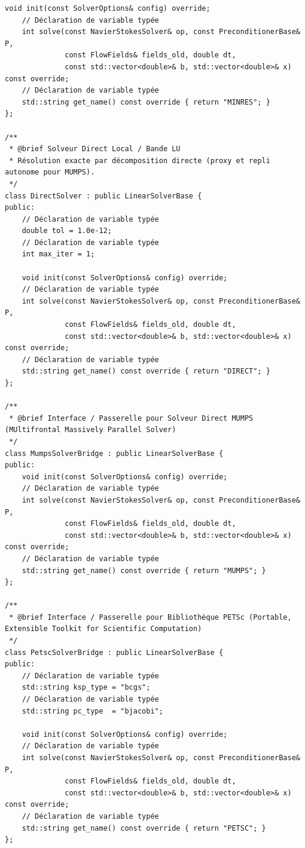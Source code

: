 \documentclass[10pt,a4paper,oneside]{book}
\begin{document}
\begin{lstlisting}[language={[11]C++}]
    void init(const SolverOptions& config) override;
    // Déclaration de variable typée
    int solve(const NavierStokesSolver& op, const PreconditionerBase& P,
              const FlowFields& fields_old, double dt,
              const std::vector<double>& b, std::vector<double>& x) const override;
    // Déclaration de variable typée
    std::string get_name() const override { return "MINRES"; }
};

/**
 * @brief Solveur Direct Local / Bande LU
 * Résolution exacte par décomposition directe (proxy et repli autonome pour MUMPS).
 */
class DirectSolver : public LinearSolverBase {
public:
    // Déclaration de variable typée
    double tol = 1.0e-12;
    // Déclaration de variable typée
    int max_iter = 1;

    void init(const SolverOptions& config) override;
    // Déclaration de variable typée
    int solve(const NavierStokesSolver& op, const PreconditionerBase& P,
              const FlowFields& fields_old, double dt,
              const std::vector<double>& b, std::vector<double>& x) const override;
    // Déclaration de variable typée
    std::string get_name() const override { return "DIRECT"; }
};

/**
 * @brief Interface / Passerelle pour Solveur Direct MUMPS (MUltifrontal Massively Parallel Solver)
 */
class MumpsSolverBridge : public LinearSolverBase {
public:
    void init(const SolverOptions& config) override;
    // Déclaration de variable typée
    int solve(const NavierStokesSolver& op, const PreconditionerBase& P,
              const FlowFields& fields_old, double dt,
              const std::vector<double>& b, std::vector<double>& x) const override;
    // Déclaration de variable typée
    std::string get_name() const override { return "MUMPS"; }
};

/**
 * @brief Interface / Passerelle pour Bibliothèque PETSc (Portable, Extensible Toolkit for Scientific Computation)
 */
class PetscSolverBridge : public LinearSolverBase {
public:
    // Déclaration de variable typée
    std::string ksp_type = "bcgs";
    // Déclaration de variable typée
    std::string pc_type  = "bjacobi";

    void init(const SolverOptions& config) override;
    // Déclaration de variable typée
    int solve(const NavierStokesSolver& op, const PreconditionerBase& P,
              const FlowFields& fields_old, double dt,
              const std::vector<double>& b, std::vector<double>& x) const override;
    // Déclaration de variable typée
    std::string get_name() const override { return "PETSC"; }
};


\end{lstlisting}
\end{document}
